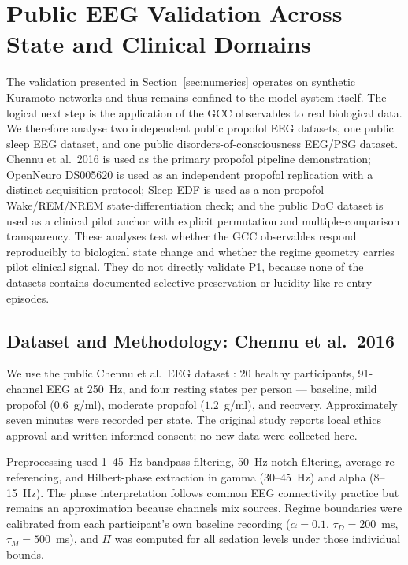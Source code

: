 \documentclass[11pt,a4paper]{article}
\theoremstyle{plain}
\theoremstyle{definition}
\theoremstyle{remark}
\begin{document}
\iffalse
\section{Public EEG Validation Across State and Clinical Domains}
\label{sec:pilot-old}

The validation presented in Section~\ref{sec:numerics} operates on synthetic Kuramoto networks and thus remains confined to the model system itself. The logical next step is the application of the GCC observables to real biological data. We therefore analyse two independent public propofol EEG datasets, one public sleep EEG dataset, and one public disorders-of-consciousness EEG/PSG dataset. Chennu et al.\ 2016 is used as the primary propofol pipeline demonstration; OpenNeuro DS005620 is used as an independent propofol replication with a distinct acquisition protocol; Sleep-EDF is used as a non-propofol Wake/REM/NREM state-differentiation check; and the public DoC dataset is used as a clinical pilot anchor with explicit permutation and multiple-comparison transparency. These analyses test whether the GCC observables respond reproducibly to biological state change and whether the regime geometry carries pilot clinical signal. They do not directly validate P1, because none of the datasets contains documented selective-preservation or lucidity-like re-entry episodes.

\subsection{Dataset and Methodology: Chennu et al.\ 2016}

We use the public Chennu et al.\ EEG dataset \citep{chennu2016}: 20 healthy participants, 91-channel EEG at 250~Hz, and four resting states per person --- baseline, mild propofol ($0.6$~\textmu g/ml), moderate propofol ($1.2$~\textmu g/ml), and recovery. Approximately seven minutes were recorded per state. The original study reports local ethics approval and written informed consent; no new data were collected here.

Preprocessing used 1--45~Hz bandpass filtering, 50~Hz notch filtering, average re-referencing, and Hilbert-phase extraction in gamma (30--45~Hz) and alpha (8--15~Hz). The phase interpretation follows common EEG connectivity practice \citep{lachaux1999} but remains an approximation because channels mix sources. Regime boundaries were calibrated from each participant's own baseline recording ($\alpha=0.1$, $\tau_D=200$~ms, $\tau_M=500$~ms), and $\Pi$ was computed for all sedation levels under those individual bounds.
\end{document}
